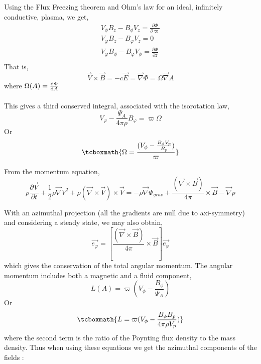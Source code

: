 \documentclass[10pt,a4paper,english]{article}
\begin{document}
Using the Flux Freezing theorem and Ohm's law for an ideal, infinitely conductive, plasma, we get,
\begin{align*}
   V_{\phi}B_{z}-B_{\phi}V_{z} = \frac{\partial \Phi}{\partial \varpi} \\
   V_{\varphi}B_{z}-B_{\varphi}V_{z} = 0 \\
   V_{\varphi}B_{\phi}-B_{\varphi}V_{\phi} = \frac{\partial \Phi}{\partial z} \\
\end{align*} 
That is,
\begin{equation}
   \overrightarrow{V} \times \overrightarrow{B} = -c\overrightarrow{E} = \vec \nabla \Phi = \Omega\vec \nabla A
\end{equation}
where $\Omega(A) = \frac{\mathrm{d}{\Phi}}{\mathrm{d}{A}} $
\\
\\
This gives a third conserved integral, associated with the isorotation law,
\begin{equation}
   V_{\varphi} - \frac{\Psi_{A}}{4\pi\rho}B_{\varphi} = \varpi \Omega
\end{equation} 
Or
\begin{equation}
    \tcboxmath{
       \Omega = \frac{(V_{\phi} - \frac{B_{\phi}V_{p}}{B_{p}})}{\varpi}
    }
\end{equation}

From the momentum equation,
\begin{equation}
   \rho\frac{\partial\overrightarrow{V}}{\partial t} + \frac{1}{2}\rho \vec \nabla V^{2} + \rho (\vec \nabla \times \overrightarrow{V}) \times \overrightarrow{V} = - \rho \vec \nabla \Phi_{grav} + \frac{(\vec \nabla \times \overrightarrow{B})}{4\pi} \times \overrightarrow{B}-\vec \nabla p
\end{equation}

With an azimuthal projection (all the gradients are null due to axi-symmetry) and considering a steady state, we may also obtain,
\begin{equation}
   [ \rho(\vec \nabla \times \overrightarrow{V}) \times \overrightarrow{V}]\overrightarrow{e_{\varphi}} = [\frac{(\vec \nabla \times \overrightarrow{B})}{4\pi} \times \overrightarrow{B}]\overrightarrow{e_{\varphi}}
\end{equation}
which gives the conservation of the total angular momentum. The angular momentum includes both a magnetic and a fluid component,
\begin{equation}
   L(A) = \varpi (V_{\phi} - \frac{B_{\phi}}{\Psi_{A}}) 
\end{equation}
Or
\begin{equation}
    \tcboxmath{
     L = \varpi (V_{\phi} - \frac{B_{\phi}B_{p}}{4\pi\rho V_{p}})  
    }
\end{equation}
where the second term is the ratio of the Poynting flux density to the mass density. Thus when using these equations we get the azimuthal components of the fields :
\end{document}
